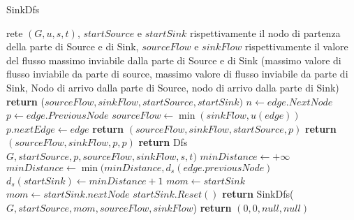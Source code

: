 \documentclass{article}
\begin{document}
\begin{algorithm}
    \caption{SinkDfs}
    \begin{algorithmic}
        \REQUIRE rete $(G,u,s,t)$, $startSource$ e $startSink$ rispettivamente il nodo di partenza della parte di Source e di Sink, $sourceFlow$ e $sinkFlow$ rispettivamente il valore del flusso massimo inviabile dalla parte di Source e di Sink
        \ENSURE (massimo valore di flusso inviabile da parte di source, massimo valore di flusso inviabile da parte di Sink, Nodo di arrivo dalla parte di Source, nodo di arrivo dalla parte di Sink)
        \STATE \textbf{return} ($sourceFlow,sinkFlow,startSource,startSink)$
            \ENDIF
            \STATE $n \leftarrow edge.NextNode$
            \STATE $p \leftarrow edge.PreviousNode$
            \STATE $sourceFlow \leftarrow \min(sinkFlow, u(edge))$
            \STATE $ p.nextEdge \leftarrow edge$ 
            \STATE \textbf{return} $(sourceFlow,sinkFlow,startSource,p)$
            \ENDIF
            \STATE \textbf{return}  $(sourceFlow, sinkFlow,p,p)$
            \ENDIF
            \STATE \textbf{return} Dfs$G,startSource, p, sourceFlow, sinkFlow,s,t)$
            \ENDIF
            \ENDFOR
            \STATE $minDistance \leftarrow +\infty$
            \STATE $minDistance \leftarrow \min(minDistance, d_s(edge.previousNode)$
            \ENDIF
            \ENDFOR
            \STATE $d_s(startSink) \leftarrow minDistance+1$
            \STATE $mom \leftarrow startSink$
            \ELSE
            \STATE $mom \leftarrow startSink.nextNode$
            \ENDIF
            \STATE $startSink.Reset()$
            \STATE \textbf{return} SinkDfs($G,startSource, mom, sourceFlow, sinkFlow$)
            \ENDIF
            \STATE \textbf{return} $(0,0,null,null)$

    \end{algorithmic}
\end{algorithm}
\end{document}
